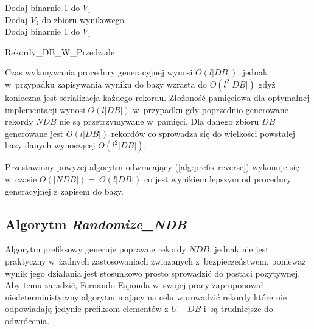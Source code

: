 \begin{algorithm}[H]
    \SetAlgoLined
    Dodaj binarnie $1$ do $V_1$\\
    {
       Dodaj $V_1$ do zbioru wynikowego. \\
       Dodaj binarnie $1$ do $V_1$\\
    }
    \caption{Rekordy\_DB\_W\_Przedziale}
    \label{alg:prefix-reverse-print}
\end{algorithm}


Czas wykonywania procedury generacyjnej wynosi $O(l|DB|)$, jednak w~przypadku zapisywania wyniku do bazy wzrasta do $O(l^2|DB|)$ gdyż konieczna jest serializacja każdego rekordu.
Złożoność pamięciowa dla optymalnej implementacji wynosi $O(l|DB|)$ w~przypadku gdy poprzednio generowane rekordy $NDB$ nie są przetrzymywane w~pamięci. 
Dla danego zbioru $DB$ generowane jest $O(l|DB|)$ rekordów co sprowadza się do wielkości powstałej bazy danych wynoszącej $O(l^2|DB|)$.

Przestawiony powyżej algorytm odwracający (\ref{alg:prefix-reverse}) wykonuje się w~czasie $O(|NDB|)=~O(l|DB|)$ co jest wynikiem lepszym od procedury generacyjnej z zapisem do bazy.

\subsection{Algorytm \textit{Randomize\_NDB}}
Algorytm prefiksowy generuje poprawne rekordy $NDB$, jednak nie jest praktyczny w~żadnych zastosowaniach związanych
z~bezpieczeństwem, ponieważ wynik jego działania jest stosunkowo prosto sprowadzić do postaci pozytywnej. 
Aby temu zaradzić, Fernando Esponda w~swojej pracy\cite{NRI-Esponda} zaproponował 
niedeterministyczny algorytm mający na celu wprowadzić rekordy które nie odpowiadają jedynie prefiksom elementów
z $U - DB$ i~są trudniejsze do odwrócenia.

